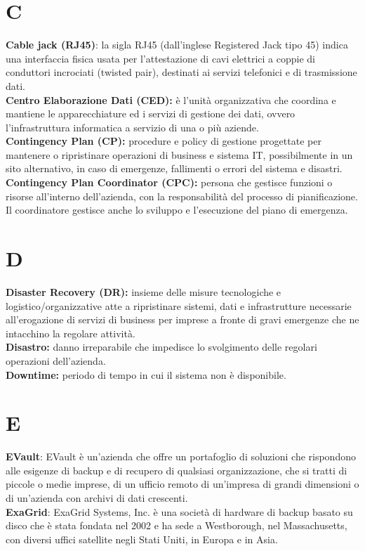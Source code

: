 \documentclass[12pt, a4paper, titlepage]{report}
\begin{document}
	\section*{C}
	\textbf{Cable jack (RJ45)}: la sigla RJ45 (dall'inglese Registered Jack tipo 45) indica una interfaccia fisica usata per l'attestazione di cavi elettrici a coppie di conduttori incrociati (twisted pair), destinati ai servizi telefonici e di trasmissione dati. \\
	\textbf{Centro Elaborazione Dati (CED):} è l'unità organizzativa che coordina e mantiene le apparecchiature ed i servizi di gestione dei dati, ovvero l'infrastruttura informatica a servizio di una o più aziende.\\
	\textbf{Contingency Plan (CP):} procedure e policy di gestione progettate per mantenere o ripristinare operazioni di business e sistema IT, possibilmente in un sito alternativo, in caso di emergenze, fallimenti o errori del sistema e disastri.\\
	\textbf{Contingency Plan Coordinator (CPC):} persona che gestisce funzioni o risorse all'interno dell'azienda, con la responsabilità del processo di pianificazione. Il coordinatore gestisce anche lo sviluppo e l'esecuzione del piano di emergenza.
	
	\section*{D}
	\textbf{Disaster Recovery (DR):} insieme delle misure tecnologiche e logistico/organizzative atte a ripristinare sistemi, dati e infrastrutture necessarie all'erogazione di servizi di business per imprese a fronte di gravi emergenze che ne intacchino la regolare attività.\\
	\textbf{Disastro:} danno irreparabile che impedisce lo svolgimento delle regolari operazioni dell'azienda.\\
	\textbf{Downtime:} periodo di tempo in cui il sistema non è disponibile.
	
	\section*{E}
	\textbf{EVault}: EVault è un'azienda che offre un portafoglio di soluzioni che rispondono alle esigenze di backup e di recupero di qualsiasi organizzazione, che si tratti di piccole o medie imprese, di un ufficio remoto di un'impresa di grandi dimensioni o di un'azienda con archivi di dati crescenti. \\
	\textbf{ExaGrid}: ExaGrid Systems, Inc. è una società di hardware di backup basato su disco che è stata fondata nel 2002 e ha sede a Westborough, nel Massachusetts, con diversi uffici satellite negli Stati Uniti, in Europa e in Asia.
	
\end{document}
